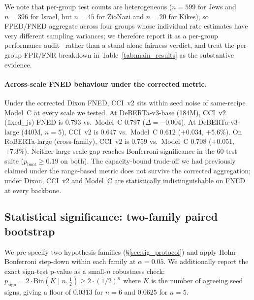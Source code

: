 We note that per-group test counts are heterogeneous ($n=599$ for Jews and $n=396$ for Israel, but $n=45$ for ZioNazi and $n=20$ for Kikes), so FPED/FNED aggregate across four groups whose individual rate estimates have very different sampling variances; we therefore report it as a per-group performance audit~\citep{veitch2021counterfactual} rather than a stand-alone fairness verdict, and treat the per-group FPR/FNR breakdown in Table~\ref{tab:main_results} as the substantive evidence.

\paragraph{Across-scale FNED behaviour under the corrected metric.}
Under the corrected Dixon FNED, CCI~v2 sits within seed noise of same-recipe Model~C at every scale we tested. At DeBERTa-v3-base (184M), CCI~v2 (fixed\_js) FNED is $0.793$ vs.\ Model~C $0.797$ ($\Delta = -0.004$). At DeBERTa-v3-large (440M, $n=5$), CCI~v2 is $0.647$ vs.\ Model~C $0.612$ ($+0.034$, $+5.6\%$). On RoBERTa-large (cross-family), CCI~v2 is $0.759$ vs.\ Model~C $0.708$ ($+0.051$, $+7.3\%$). Neither large-scale gap reaches Bonferroni-significance in the 60-test suite ($p_{\text{boot}} \ge 0.19$ on both). The capacity-bound trade-off we had previously claimed under the range-based metric does not survive the corrected aggregation; under Dixon, CCI~v2 and Model~C are statistically indistinguishable on FNED at every backbone.

\subsection{Statistical significance: two-family paired bootstrap}
\label{sec:significance}

We pre-specify two hypothesis families (\S\ref{sec:sig_protocol}) and apply Holm-Bonferroni step-down within each family at $\alpha = 0.05$. We additionally report the exact sign-test p-value as a small-$n$ robustness check: $p_{\text{sign}} = 2 \cdot \mathrm{Bin}(K \mid n, \tfrac{1}{2}) \ge 2 \cdot (1/2)^n$ where $K$ is the number of agreeing seed signs, giving a floor of $0.0313$ for $n=6$ and $0.0625$ for $n=5$.

